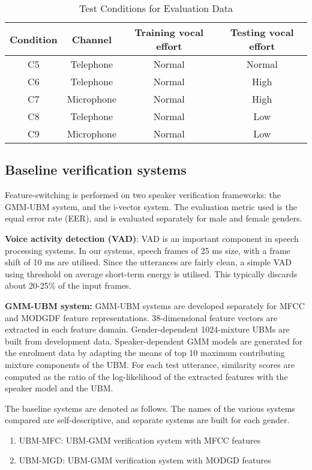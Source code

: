 \documentclass{article}
\begin{document}
\begin{table}[h!tb]
\centering
\caption{Test Conditions for Evaluation Data}
\begin{tabular}{|c|c|c|c|}
\hline
Condition & Channel & Training vocal effort & Testing vocal effort \\ 
\hline \hline
C5 & Telephone & Normal & Normal \\ \hline
C6 & Telephone & Normal & High \\ \hline
C7 & Microphone & Normal & High \\ \hline
C8 & Telephone & Normal & Low \\ \hline
C9 & Microphone & Normal & Low \\ \hline
\end{tabular}
\label{tab:datasetConditions}
\end{table}



\subsection{Baseline verification systems}
\label{subsec:baseline}

Feature-switching is performed on two speaker verification frameworks: the GMM-UBM system, 
and the i-vector system. The evaluation
metric used is the equal error rate (EER), and is evaluated separately
for male and female genders.

\textbf{Voice activity detection (VAD)}: VAD is an important component in speech
processing systems. In our systems, speech frames of 25 ms size, with a frame
shift of 10 ms are utilised. Since the utterances are fairly clean, a simple VAD
using threshold on average short-term energy is utilised. This typically
discards about 20-25\% of the input frames.

\textbf{GMM-UBM system:} GMM-UBM systems are developed separately for 
MFCC and MODGDF feature representations. 38-dimensional feature vectors are 
extracted in each feature domain. Gender-dependent 1024-mixture UBMs are built 
from development data.  Speaker-dependent GMM models are generated for the 
enrolment data by adapting the means of top 10 maximum contributing mixture 
components of the UBM. For each test utterance, similarity scores are computed 
as the ratio of the log-likelihood of the extracted features with the speaker
model and the UBM.

The baseline systems are denoted as follows. The names of the various systems
compared are self-descriptive, and separate systems are built for each gender.
\begin{enumerate}
\item UBM-MFC: UBM-GMM verification system with MFCC features
\item UBM-MGD: UBM-GMM verification system with MODGD features
\end{enumerate}
\end{document}
